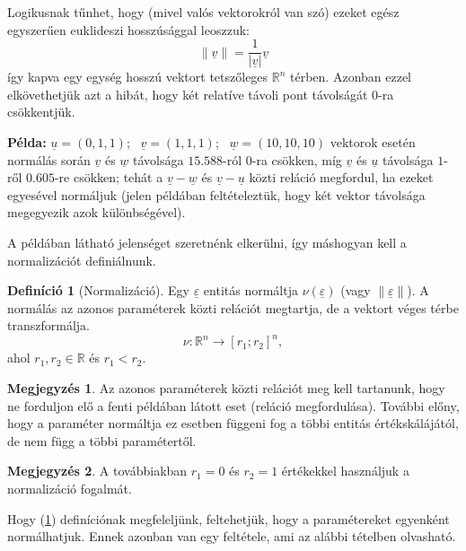 \documentclass{article}
\theoremstyle{definition}
\newtheorem{definition}{Definíció}[section]
\newtheorem*{megj}{Megjegyzés}
\newcommand{\vect}[1]{ \underline{#1} }
\newcommand{\norm}[1]{ \parallel {#1} \parallel }
\newcommand{\pl}{ \textbf{Példa:} }
\begin{document}
\begin{multicols}{2}
    Logikusnak tűnhet, hogy (mivel valós vektorokról van szó) ezeket egész egyszerűen euklideszi hosszúsággal leoszzuk:
    $$ \parallel\vect{v}\parallel = \frac{1}{|\vect{v}|} \vect{v} $$
    így kapva egy egység hosszú vektort tetszőleges $\mathbb{R}^n$ térben. Azonban ezzel elkövethetjük azt a hibát, hogy két relatíve távoli pont távolságát 0-ra csökkentjük.
    
    \pl $\vect u = (0, 1, 1)$; \ $\vect v = (1, 1, 1)$; \ $\vect w = (10, 10, 10)$
    vektorok esetén normálás során $\vect v$ és $\vect w$ távolsága $15.588$-ról $0$-ra csökken, míg $\vect v$ és $\vect u$ távolsága $1$-ről $0.605$-re csökken; tehát a $\vect v - \vect w$ és $\vect v - \vect u$ közti reláció megfordul, ha ezeket egyesével normáljuk (jelen példában feltételeztük, hogy két vektor távolsága megegyezik azok különbségével).
    
    A példában látható jelenséget szeretnénk elkerülni, így máshogyan kell a normalizációt definiálnunk.
    
    \begin{definition}[Normalizáció]\label{def:norm}
        Egy $\vect\varepsilon$ entitás normáltja $\nu(\vect\varepsilon)$ (vagy $\norm{\vect\varepsilon}$). A normálás az azonos paraméterek közti relációt megtartja, de a vektort véges térbe transzformálja.
        \begin{equation}
            \nu : \mathbb{R}^n \to [r_1; r_2]^n,
        \end{equation}
        ahol $r_1, r_2 \in \mathbb{R}$ és $r_1 < r_2$.
        
        \begin{megj}
            Az azonos paraméterek közti relációt meg kell tartanunk, hogy ne forduljon elő a fenti példában látott eset (reláció megfordulása). További előny, hogy a paraméter normáltja ez esetben függeni fog a többi entitás értékskálájától, de nem függ a többi paramétertől.
        \end{megj}
        
        \begin{megj}
            A továbbiakban $r_1 = 0$ és $r_2 = 1$ értékekkel használjuk a normalizáció fogalmát.
        \end{megj}
    \end{definition}
    
    Hogy \az (\ref{def:norm}) definíciónak megfeleljünk, feltehetjük, hogy a paramétereket egyenként normálhatjuk. Ennek azonban van egy feltétele, ami az alábbi tételben olvasható.
    

\end{multicols}
\end{document}
